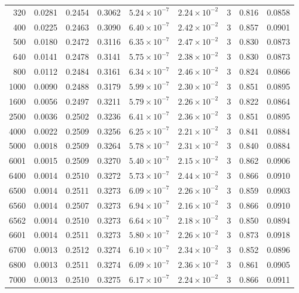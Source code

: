 \documentclass[11pt,letterpaper]{article}
\begin{document}
\begin{small}
\begin{longtable}{rrrrrrrrr}
320 & 0.0281 & 0.2454 & 0.3062 & $5.24\times10^{-7}$ & $2.24\times10^{-2}$ & 3 & 0.816 & 0.0858 \\
400 & 0.0225 & 0.2463 & 0.3090 & $6.40\times10^{-7}$ & $2.42\times10^{-2}$ & 3 & 0.857 & 0.0901 \\
500 & 0.0180 & 0.2472 & 0.3116 & $6.35\times10^{-7}$ & $2.47\times10^{-2}$ & 3 & 0.830 & 0.0873 \\
640 & 0.0141 & 0.2478 & 0.3141 & $5.75\times10^{-7}$ & $2.38\times10^{-2}$ & 3 & 0.830 & 0.0873 \\
800 & 0.0112 & 0.2484 & 0.3161 & $6.34\times10^{-7}$ & $2.46\times10^{-2}$ & 3 & 0.824 & 0.0866 \\
1000 & 0.0090 & 0.2488 & 0.3179 & $5.99\times10^{-7}$ & $2.30\times10^{-2}$ & 3 & 0.851 & 0.0895 \\
1600 & 0.0056 & 0.2497 & 0.3211 & $5.79\times10^{-7}$ & $2.26\times10^{-2}$ & 3 & 0.822 & 0.0864 \\
2500 & 0.0036 & 0.2502 & 0.3236 & $6.41\times10^{-7}$ & $2.36\times10^{-2}$ & 3 & 0.851 & 0.0895 \\
4000 & 0.0022 & 0.2509 & 0.3256 & $6.25\times10^{-7}$ & $2.21\times10^{-2}$ & 3 & 0.841 & 0.0884 \\
5000 & 0.0018 & 0.2509 & 0.3264 & $5.78\times10^{-7}$ & $2.31\times10^{-2}$ & 3 & 0.840 & 0.0884 \\
6001 & 0.0015 & 0.2509 & 0.3270 & $5.40\times10^{-7}$ & $2.15\times10^{-2}$ & 3 & 0.862 & 0.0906 \\
6400 & 0.0014 & 0.2510 & 0.3272 & $5.73\times10^{-7}$ & $2.44\times10^{-2}$ & 3 & 0.866 & 0.0910 \\
6500 & 0.0014 & 0.2511 & 0.3273 & $6.09\times10^{-7}$ & $2.26\times10^{-2}$ & 3 & 0.859 & 0.0903 \\
6560 & 0.0014 & 0.2507 & 0.3273 & $6.94\times10^{-7}$ & $2.16\times10^{-2}$ & 3 & 0.866 & 0.0910 \\
6562 & 0.0014 & 0.2510 & 0.3273 & $6.64\times10^{-7}$ & $2.18\times10^{-2}$ & 3 & 0.850 & 0.0894 \\
6601 & 0.0014 & 0.2511 & 0.3273 & $5.80\times10^{-7}$ & $2.26\times10^{-2}$ & 3 & 0.873 & 0.0918 \\
6700 & 0.0013 & 0.2512 & 0.3274 & $6.10\times10^{-7}$ & $2.34\times10^{-2}$ & 3 & 0.852 & 0.0896 \\
6800 & 0.0013 & 0.2511 & 0.3274 & $6.09\times10^{-7}$ & $2.36\times10^{-2}$ & 3 & 0.861 & 0.0905 \\
7000 & 0.0013 & 0.2510 & 0.3275 & $6.17\times10^{-7}$ & $2.24\times10^{-2}$ & 3 & 0.866 & 0.0911 \\
\end{longtable}
\end{small}
\end{document}
